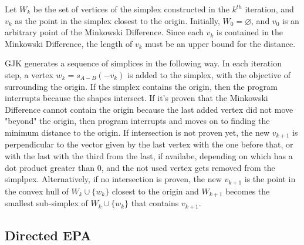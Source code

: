 \par Let $W_k$ be the set of vertices of the simplex constructed in the $k^{th}$ iteration, and $v_k$ as the point in the simplex closest to the origin. Initially, $W_0=\varnothing$, and $v_0$ is an arbitrary point of the Minkowski Difference. Since each $v_k$ is contained in the Minkowski Difference, the length of $v_k$ must be an upper bound for the distance.
\par \ac{GJK} generates a sequence of simplices in the following way. In each iteration step, a vertex $w_k = s_{A-B}(-v_k)$ is added to the simplex, with the objective of surrounding the origin. If the simplex contains the origin, then the program interrupts because the shapes intersect. If it's proven that the Minkowski Difference cannot contain the origin because the last added vertex did not move "beyond" the origin, then program interrupts and moves on to finding the minimum distance to the origin. If intersection is not proven yet, the new $v_{k+1}$ is perpendicular to the vector given by the last vertex with the one before that, or with the last with the third from the last, if availabe, depending on which has a dot product greater than 0, and the not used vertex gets removed from the simplpex. Alternatively, if no intersection is proven, the new $v_{k+1}$ is the point in the convex hull of $W_k\cup \{w_k\}$ closest to the origin and $W_{k+1}$ becomes the smallest sub-simplex of $W_k\cup \{w_k\}$ that contains $v_{k+1}$.


\subsection{Directed EPA}
\label{sec:eqaalg}


